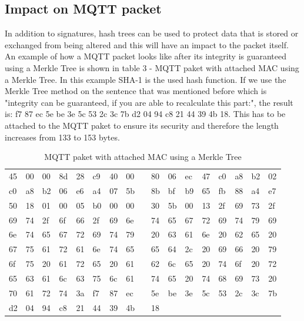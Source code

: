 \subsection{Impact on MQTT packet}
In addition to signatures, hash trees can be used to protect data that is stored or exchanged from being altered and this will have an impact to the packet itself. An example of how a MQTT packet looks like after its integrity is guaranteed using a Merkle Tree is shown in table 3 - MQTT paket with attached MAC using a Merkle Tree. In this example SHA-1 is the used hash function. If we use the Merkle Tree method on the sentence that was mentioned before which is "integrity can be guaranteed, if you are able to recalculate this part:", the result is: f7 87 ec 5e be 3e 5c 53 2c 3c 7b d2 04 94 c8 21 44 39 4b 18. This has to be attached to the MQTT paket to ensure its security and therefore the length increases from 133 to 153 bytes.

\begin{table}[]
\centering
\begin{tabular}{lllllllllllllllll}
45 & 00 & 00 & 8d & 28 & c9 & 40 & 00 &  & 80 & 06 & ec & 47 & c0 & a8 & b2 & 02 \\
c0 & a8 & b2 & 06 & e6 & a4 & 07 & 5b &  & 8b & bf & b9 & 65 & fb & 88 & a4 & e7 \\
50 & 18 & 01 & 00 & 05 & b0 & 00 & 00 &  & 30 & 5b & 00 & 13 & 2f & 69 & 73 & 2f \\
69 & 74 & 2f & 6f & 66 & 2f & 69 & 6e &  & 74 & 65 & 67 & 72 & 69 & 74 & 79 & 69 \\
6e & 74 & 65 & 67 & 72 & 69 & 74 & 79 &  & 20 & 63 & 61 & 6e & 20 & 62 & 65 & 20 \\
67 & 75 & 61 & 72 & 61 & 6e & 74 & 65 &  & 65 & 64 & 2c & 20 & 69 & 66 & 20 & 79 \\
6f & 75 & 20 & 61 & 72 & 65 & 20 & 61 &  & 62 & 6c & 65 & 20 & 74 & 6f & 20 & 72 \\
65 & 63 & 61 & 6c & 63 & 75 & 6c & 61 &  & 74 & 65 & 20 & 74 & 68 & 69 & 73 & 20 \\
70 & 61 & 72 & 74 & 3a & f7 & 87 & ec &  & 5e & be & 3e & 5c & 53 & 2c & 3c & 7b \\  
d2 & 04 & 94 & c8 & 21 & 44 & 39 & 4b &  & 18 &  &  &  &  &  &  & \\
\end{tabular}
\caption{MQTT paket with attached MAC using a Merkle Tree}
\label{tab:my-table}
\end{table}
